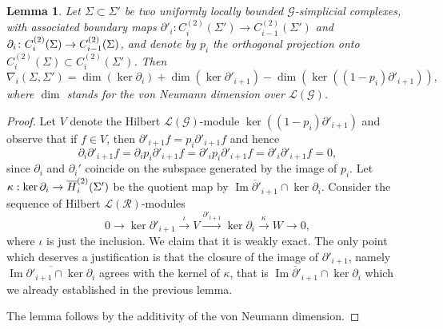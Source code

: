\documentclass[10pt]{amsart}
\newtheorem{lemm}[cdrthm]{Lemma}
\theoremstyle{definition}
\newcommand{\RR}{\mathcal{R}}
\newcommand{\LL}{\mathcal{L}}
\newcommand{\cg}{\mathcal{G}}
\DeclareMathOperator{\Ima}{Im}
\begin{document}
\begin{lemm}\label{lem:formula_for_nabla}
Let $\Sigma \subset \Sigma'$ be two uniformly locally bounded $\cg$-simplicial complexes, with associated boundary maps $\partial'_i \colon C^{(2)}_i(\Sigma') \to C^{(2)}_{i-1}(\Sigma')$ and $\partial_i \colon C^{(2)}_i(\Sigma)\linebreak\to C^{(2)}_{i-1}(\Sigma)$, and denote by $p_i$ the orthogonal projection onto $C^{(2)}_i(\Sigma)\subset C^{(2)}_i(\Sigma')$. Then
\[
\nabla_i\left(\Sigma,\Sigma'\right) = \dim\left(\ker \partial_i\right) + \dim\left(\ker \partial'_{i+1}\right) - \dim\left(\ker\left(\left(1-p_i\right)\partial'_{i+1}\right)\right),
\]
where $\dim$ stands for the von Neumann dimension over $\LL(\cg)$.
\end{lemm}
\begin{proof}
Let $V$ denote the Hilbert $\LL(\cg)$-module $\ker((1-p_i)\partial'_{i+1})$ and observe that if $f\in V$, then $\partial'_{i+1}f=p_i\partial'_{i+1}f$ and hence
\[
\partial_i\partial'_{i+1}f=\partial_i p_i\partial'_{i+1}f=\partial'_ip_i\partial'_{i+1}f=\partial'_i\partial'_{i+1}f=0,
\]
since $\partial_i$ and $\partial_i'$ coincide on the subspace generated by the image of $p_i$. Let $\kappa:\ker \partial_i\linebreak\rightarrow \overline H_i^{(2)}(\Sigma')$ be the quotient map by $\overline{\Ima \partial'_{i+1}} \cap \ker \partial_i$. Consider the sequence of Hilbert $\LL(\RR)$-modules
\[
0 \to \ker \partial'_{i+1} \xrightarrow{\iota} V \xrightarrow{\partial'_{i+1}} \ker \partial_i \xrightarrow{\kappa} W \to 0,
\]
where $\iota$ is just the inclusion. We claim that it is weakly exact. The only point which deserves a justification is that the closure of the image of $\partial'_{i+1}$, namely $\overline{\Ima \partial'_{i+1} \cap \ker \partial_i}$ agrees with the kernel of $\kappa$, that is $\overline{\Ima \partial'_{i+1}} \cap \ker \partial_i$ which we already established in the previous lemma.

The lemma follows by the additivity of the von Neumann dimension.
\end{proof}
\end{document}
